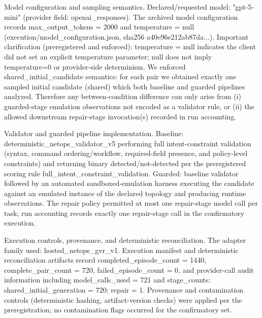 \documentclass[conference]{IEEEtran}
\begin{document}
Model configuration and sampling semantics. Declared/requested model: "gpt-5-mini" (provider field: openai\_responses). The archived model configuration records max\_output\_tokens = 2000 and temperature = null (execution/model\_configuration.json, sha256 a40e96e212ab87da...). Important clarification (preregistered and enforced): temperature = null indicates the client did not set an explicit temperature parameter; null does not imply temperature=0 or provider-side determinism. We enforced shared\_initial\_candidate semantics: for each pair we obtained exactly one sampled initial candidate (shared) which both baseline and guarded pipelines analyzed. Therefore any between-condition difference can only arise from (i) guarded-stage emulation observations not encoded as a validator rule, or (ii) the allowed downstream repair-stage invocation(s) recorded in run accounting.

Validator and guarded pipeline implementation. Baseline: deterministic\_netops\_validator\_v5 performing full intent-constraint validation (syntax, command ordering/workflow, required-field presence, and policy-level constraints) and returning binary detected/not-detected per the preregistered scoring rule full\_intent\_constraint\_validation. Guarded: baseline validator followed by an automated sandboxed-emulation harness executing the candidate against an emulated instance of the declared topology and producing runtime observations. The repair policy permitted at most one repair-stage model call per task; run accounting records exactly one repair-stage call in the confirmatory execution.

Execution controls, provenance, and deterministic reconciliation. The adapter family used: hosted\_netops\_gvr\_v1. Execution manifest and deterministic reconciliation artifacts record completed\_episode\_count = 1440, complete\_pair\_count = 720, failed\_episode\_count = 0, and provider-call audit information including model\_calls\_used = 721 and stage\_counts: shared\_initial\_generation = 720; repair = 1. Provenance and contamination controls (deterministic hashing, artifact-version checks) were applied per the preregistration; no contamination flags occurred for the confirmatory set.
\end{document}
